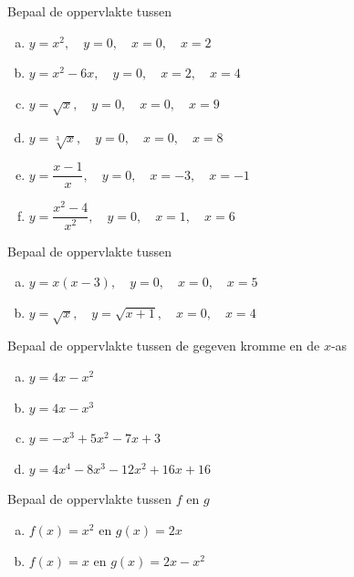 \documentclass[a4paper,12pt, twoside]{article}
\begin{document}
\begin{oefening}
Bepaal de oppervlakte tussen
\begin{enumerate}[(a)]
\itemsep1em
  \item $\displaystyle y=x^2,\quad y=0,\quad x=0, \quad x=2$
  \item $\displaystyle y=x^2-6x,\quad y=0,\quad x=2, \quad x=4$
  \item $\displaystyle y=\sqrt{x},\quad y=0,\quad x=0, \quad x=9$
  \item $\displaystyle y=\sqrt[3]{x},\quad y=0,\quad x=0, \quad x=8$
  \item $\displaystyle y=\dfrac{x-1}{x},\quad y=0,\quad x=-3, \quad x=-1$
  \item $\displaystyle y=\dfrac{x^2-4}{x^2},\quad y=0,\quad x=1, \quad x=6$
\end{enumerate}
\end{oefening}

\begin{oefening}
Bepaal de oppervlakte tussen
\begin{enumerate}[(a)]
\itemsep1em
  \item $\displaystyle y=x(x-3),\quad y=0,\quad x=0, \quad x=5$
  \item $\displaystyle y=\sqrt{x},\quad y=\sqrt{x+1},\quad x=0, \quad x=4$
\end{enumerate}
\end{oefening}


\begin{oefening}
Bepaal de oppervlakte tussen de gegeven kromme en de $x$-as
\begin{multicols}{2}
\begin{enumerate}[(a)]
\itemsep1em
  \item $\displaystyle y=4x-x^2$
  \item $\displaystyle y=4x-x^3$
  \item $\displaystyle y=-x^3+5x^2-7x+3$
  \item $\displaystyle y=4x^4-8x^3-12x^2+16x+16$
\end{enumerate}
\end{multicols}
\end{oefening}

\begin{oefening}
Bepaal de oppervlakte tussen $f$ en $g$
\begin{enumerate}[(a)]
\itemsep1em
  \item $f(x)=x^2$ en $g(x)=2x$
  \item $f(x)=x$ en $g(x)=2x-x^2$
\end{enumerate}
\end{oefening}
\end{document}
